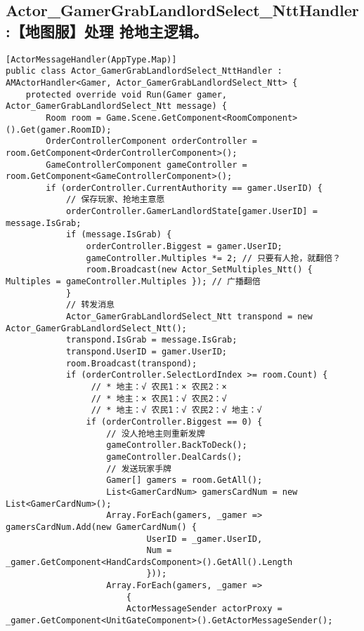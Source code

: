 \documentclass[9pt, b5paper]{article}
\begin{document}
\subsection{Actor\_GamerGrabLandlordSelect\_NttHandler:【地图服】处理 抢地主逻辑。}
\label{sec-3-1}
\begin{verbatim}
[ActorMessageHandler(AppType.Map)]
public class Actor_GamerGrabLandlordSelect_NttHandler : AMActorHandler<Gamer, Actor_GamerGrabLandlordSelect_Ntt> {
    protected override void Run(Gamer gamer, Actor_GamerGrabLandlordSelect_Ntt message) {
        Room room = Game.Scene.GetComponent<RoomComponent>().Get(gamer.RoomID);
        OrderControllerComponent orderController = room.GetComponent<OrderControllerComponent>();
        GameControllerComponent gameController = room.GetComponent<GameControllerComponent>();
        if (orderController.CurrentAuthority == gamer.UserID) {
            // 保存玩家、抢地主意愿
            orderController.GamerLandlordState[gamer.UserID] = message.IsGrab;
            if (message.IsGrab) {
                orderController.Biggest = gamer.UserID;
                gameController.Multiples *= 2; // 只要有人抢，就翻倍？
                room.Broadcast(new Actor_SetMultiples_Ntt() { Multiples = gameController.Multiples }); // 广播翻倍
            }
            // 转发消息
            Actor_GamerGrabLandlordSelect_Ntt transpond = new Actor_GamerGrabLandlordSelect_Ntt();
            transpond.IsGrab = message.IsGrab;
            transpond.UserID = gamer.UserID;
            room.Broadcast(transpond);
            if (orderController.SelectLordIndex >= room.Count) {
                 // * 地主：√ 农民1：× 农民2：×
                 // * 地主：× 农民1：√ 农民2：√
                 // * 地主：√ 农民1：√ 农民2：√ 地主：√
                if (orderController.Biggest == 0) {
                    // 没人抢地主则重新发牌
                    gameController.BackToDeck();
                    gameController.DealCards();
                    // 发送玩家手牌
                    Gamer[] gamers = room.GetAll();
                    List<GamerCardNum> gamersCardNum = new List<GamerCardNum>();
                    Array.ForEach(gamers, _gamer => gamersCardNum.Add(new GamerCardNum() {
                            UserID = _gamer.UserID,
                            Num = _gamer.GetComponent<HandCardsComponent>().GetAll().Length
                            }));
                    Array.ForEach(gamers, _gamer =>
                        {
                        ActorMessageSender actorProxy = _gamer.GetComponent<UnitGateComponent>().GetActorMessageSender();

\end{verbatim}
\end{document}
